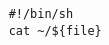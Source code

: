 \documentclass[nofonts]{ctexart}
\begin{document}
\begin{lrbox}\verbatimbox
\begin{minipage}{10em}
	\begin{verbatim}
	#!/bin/sh 
	cat ~/${file}
	\end{verbatim}
\end{minipage}
\end{lrbox}
\fbox{\usebox\verbatimbox}\quad\fbox{\usebox\verbatimbox}
\end{document}
